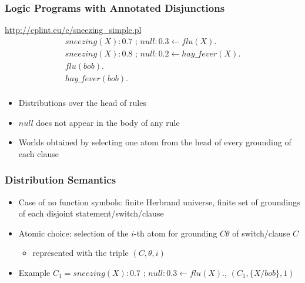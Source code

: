 \documentclass[trans]{beamer}
\newcommand\orh{\mbox{ ; }}
\newcommand{\myalert}[1]{{%
 #1}}
\begin{document}
\begin{frame}
  \frametitle{Logic Programs with Annotated Disjunctions}
  \url{http://cplint.eu/e/sneezing_simple.pl}
 $$\begin{array}{l}
sneezing(X):0.7 \orh null:0.3\leftarrow \mathit{flu}(X).\\
sneezing(X):0.8\orh null:0.2\leftarrow hay\_\mathit{fever}(X).\\
\mathit{flu}(bob).\\
hay\_\mathit{fever}(bob).\\
 \end{array}$$
\begin{itemize}
\item Distributions over the head of rules
\item $null$ does not appear in the body of any rule
\item Worlds obtained by selecting one atom from the head of every grounding of each clause
\end{itemize}
\end{frame}

\begin{frame}
  \frametitle{Distribution Semantics}
\begin{itemize}
\item Case of no function symbols: finite Herbrand universe, finite set of groundings of each disjoint statement/switch/clause
\item \myalert{Atomic choice}: selection of the $i$-th atom for grounding $C\theta$ of switch/clause $C$
\begin{itemize}
\item represented with the triple $(C,\theta,i)$
\end{itemize}
\item Example $C_1=sneezing(X):0.7\orh null:0.3\leftarrow \mathit{flu}(X).$,
$(C_1,\{X/bob\},1)$
\end{itemize}
\end{frame}
\end{document}
